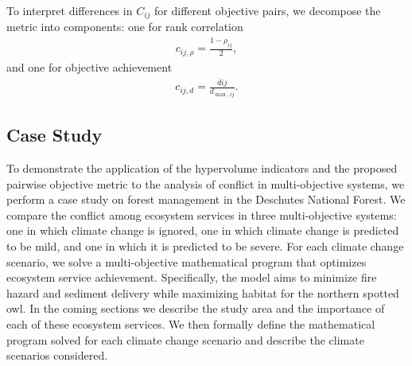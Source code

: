 To interpret differences in $C_{ij}$ for different objective pairs, we decompose the metric into components: one for rank correlation
\begin{align}
c_{ij,\rho} = \frac{1-\rho_{ij}}{2},
\end{align}
and one for objective achievement
\begin{align}
c_{ij,d} = \frac{\overbar{d}{ij}}{d_{\max,ij}}.
\end{align}



\subsection{Case Study}
\label{sec:caseStudy}
To demonstrate the application of the hypervolume indicators and the proposed pairwise objective metric to the analysis of conflict in multi-objective systems, we perform a case study on forest management in the Deschutes National Forest. We compare the conflict among ecosystem services in three multi-objective systems: one in which climate change is ignored, one in which climate change is predicted to be mild, and one in which it is predicted to be severe. For each climate change scenario, we solve a multi-objective mathematical program that optimizes ecosystem service achievement. Specifically, the model aims to minimize fire hazard and sediment delivery while maximizing habitat for the northern spotted owl. In the coming sections we describe the study area and the importance of each of these ecosystem services. We then formally define the mathematical program solved for each climate change scenario and describe the climate scenarios considered.

